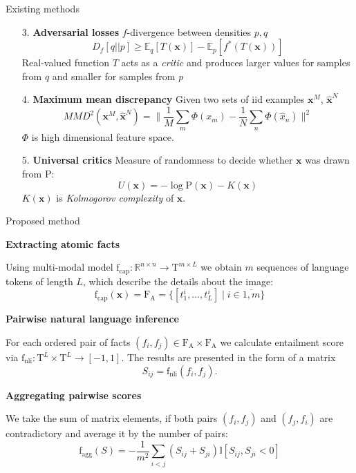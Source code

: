 \documentclass{beamer}
\begin{document}
\begin{frame}{Existing methods}

\begin{enumerate}
    \item[3.] \textbf{Adversarial losses} $f$-divergence between densities $p, q$
    \[D_f [q || p] \ge \mathbb{E}_q [T(\textbf{x})] - \mathbb{E}_p [f^* (T(\textbf{x}))]\]
    Real-valued function $T$ acts as a \textit{critic} and produces larger values for samples from $q$ and smaller for samples from $p$
    \item[4.] \textbf{Maximum mean discrepancy
} Given two sets of $\mathrm{iid}$ examples $\textbf{x}^M$, $\mathbf{\hat{x}}^N$ \[MMD^2 (\textbf{x}^M, \mathbf{\hat{x}}^N) = \| \frac1M \sum\limits_m \Phi(x_m) - \frac1N \sum\limits_n \Phi(\hat{x}_n) \|^2 \]
$\Phi$ is high dimensional feature space.
    \item[5.] \textbf{Universal critics}
    Measure of randomness to decide whether $\textbf{x}$ was drawn from $\mathrm{P}$: \[U(\textbf{x}) = -\log \mathrm{P}(\textbf{x}) - K(\textbf{x})\]
    $K(\textbf{x})$ is \textit{Kolmogorov complexity} of $\textbf{x}$.

\end{enumerate}


\end{frame}

\begin{frame}{Proposed method}


\textbf{Extracting atomic facts}

Using multi-modal model $\text{f}_\text{cap}: \mathbb{R}^{n\times n} \to \mathrm{T}^{m\times L}$ we obtain $m$ sequences of language tokens of length $L$, which describe the details about the image:
\[\text{f}_\text{cap}(\textbf{x}) = \mathrm{F}_\text{A} = \{[t^i_1, \dots, t^i_L]\;|\; i \in \overline{1, m} \} \]

\textbf{Pairwise natural language inference}

For each ordered pair of facts $(f_i, f_j) \in \mathrm{F}_\text{A} \times \mathrm{F}_\text{A}$ we calculate entailment score via $\text{f}_\text{nli}: \mathrm{T}^{L}\times \mathrm{T}^{L} \to [-1, 1]$.
The results are presented in the form of a matrix
\[S_{ij} = \text{f}_\text{nli}(f_i, f_j). \]

\textbf{Aggregating pairwise scores}

We take the sum of matrix elements, if both pairs $(f_i, f_j)$ and $(f_j, f_i)$ are contradictory and average it by the number of pairs:
\[\text{f}_\text{agg} (S) = - \dfrac{1}{m^2} \sum\limits_{i < j} (S_{ij} + S_{ji}) \mathbb{I} [S_{ij}, S_{ji} < 0] \]

\end{frame}
\end{document}
